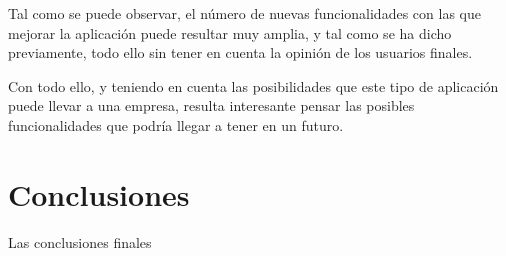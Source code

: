 \documentclass{\ClassPath/viu-tfm-template}
\begin{document}
Tal como se puede observar, el número de nuevas funcionalidades con las que mejorar la aplicación puede resultar muy amplia, y tal como se ha dicho previamente, todo ello sin tener en cuenta la opinión de los usuarios finales.

Con todo ello, y teniendo en cuenta las posibilidades que este tipo de aplicación puede llevar a una empresa, resulta interesante pensar las posibles funcionalidades que podría llegar a tener en un futuro.



\vfill
\pagebreak
\chapter{Conclusiones}
{\color{red} Las conclusiones finales}

\vfill

\pagebreak
\printbibliography[title={Referencias bibliográficas},heading=bibintoc]

\end{document}
